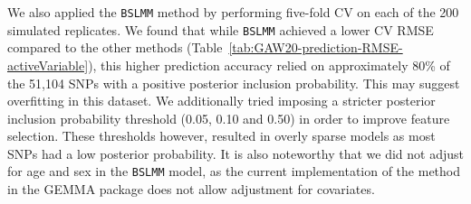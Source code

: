 \documentclass[10pt,letterpaper]{article}
\begin{document}
We also applied the \texttt{BSLMM} method by performing five-fold CV on each of the 200 simulated replicates. 
We found that while \texttt{BSLMM} achieved a lower CV RMSE compared to the other methods (Table~\ref{tab:GAW20-prediction-RMSE-activeVariable}), this higher prediction accuracy relied on approximately 80\% of the 51,104 SNPs with a positive posterior inclusion probability. 
This may suggest overfitting in this dataset. 
We additionally tried imposing a stricter posterior inclusion probability threshold (0.05, 0.10 and 0.50) in order to improve feature selection. These thresholds however, resulted in overly sparse models as most SNPs had a low posterior probability.
It is also noteworthy that we did not adjust for age and sex in the \texttt{BSLMM} model, as the current implementation of the method in the GEMMA package does not allow adjustment for covariates.


\end{document}

